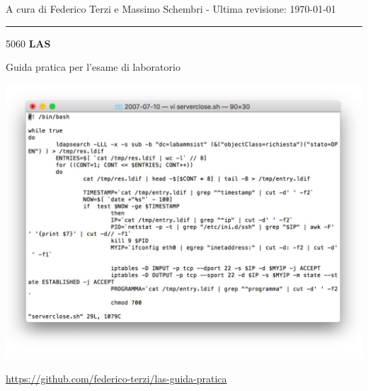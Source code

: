 \documentclass[a4paper]{report}
\makeatletter
\newcommand\HUGE{\@setfontsize\Huge{50}{60}}
\makeatother
\begin{document}
	
	
\begin{titlepage}
	\centering
	
	\large
	A cura di Federico Terzi e Massimo Schembri - Ultima revisione: \today
	
	\noindent\rule{15cm}{0.2pt}
	
	\vspace{4cm}
	
	\HUGE
	\textbf{LAS}
	
	\huge
	Guida pratica per l'esame di laboratorio
	
	\vspace{2cm}
	
	\includegraphics[width=0.9\linewidth]{cover}
	
	\vspace{3cm}
	
	\normalsize
	\url{https://github.com/federico-terzi/las-guida-pratica}
	
	\clearpage
\end{titlepage}

\end{document}
